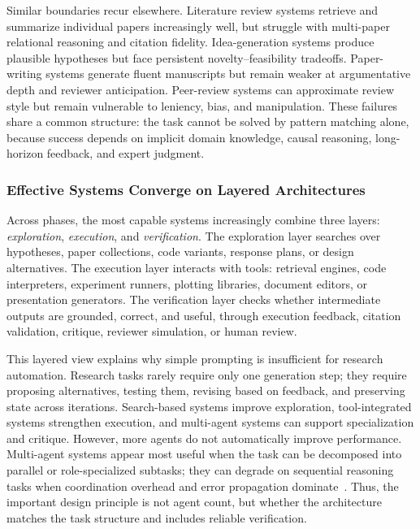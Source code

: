 Similar boundaries recur elsewhere. Literature review systems retrieve and summarize individual papers increasingly well, but struggle with multi-paper relational reasoning and citation fidelity. Idea-generation systems produce plausible hypotheses but face persistent novelty--feasibility tradeoffs. Paper-writing systems generate fluent manuscripts but remain weaker at argumentative depth and reviewer anticipation. Peer-review systems can approximate review style but remain vulnerable to leniency, bias, and manipulation. These failures share a common structure: the task cannot be solved by pattern matching alone, because success depends on implicit domain knowledge, causal reasoning, long-horizon feedback, and expert judgment.


\subsubsection{Effective Systems Converge on Layered Architectures}
\label{sec:insight_architecture}

Across phases, the most capable systems increasingly combine three layers: \emph{exploration}, \emph{execution}, and \emph{verification}. The exploration layer searches over hypotheses, paper collections, code variants, response plans, or design alternatives. The execution layer interacts with tools: retrieval engines, code interpreters, experiment runners, plotting libraries, document editors, or presentation generators. The verification layer checks whether intermediate outputs are grounded, correct, and useful, through execution feedback, citation validation, critique, reviewer simulation, or human review.

This layered view explains why simple prompting is insufficient for research automation. Research tasks rarely require only one generation step; they require proposing alternatives, testing them, revising based on feedback, and preserving state across iterations. Search-based systems improve exploration, tool-integrated systems strengthen execution, and multi-agent systems can support specialization and critique. However, more agents do not automatically improve performance. Multi-agent systems appear most useful when the task can be decomposed into parallel or role-specialized subtasks; they can degrade on sequential reasoning tasks when coordination overhead and error propagation dominate~\cite{googlemit2025scaling}. Thus, the important design principle is not agent count, but whether the architecture matches the task structure and includes reliable verification.


